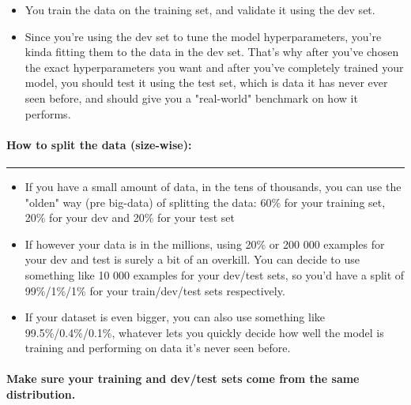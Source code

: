 \documentclass[
]{article}
\begin{document}
\begin{itemize}
\item
  You train the data on the training set, and validate it using the dev
  set.
\item
  Since you're using the dev set to tune the model hyperparameters,
  you're kinda fitting them to the data in the dev set. That's why after
  you've chosen the exact hyperparameters you want and after you've
  completely trained your model, you should test it using the test set,
  which is data it has never ever seen before, and should give you a
  "real-world" benchmark on how it performs.
\end{itemize}

\hypertarget{header-n18}{%
\paragraph{\texorpdfstring{\textbf{How to split the data
(size-wise):}}{How to split the data (size-wise):}}\label{header-n18}}

\begin{center}\rule{0.5\linewidth}{0.5pt}\end{center}

\begin{itemize}
\item
  If you have a small amount of data, in the tens of thousands, you can
  use the "olden" way (pre big-data) of splitting the data: 60\% for
  your training set, 20\% for your dev and 20\% for your test set
\item
  If however your data is in the millions, using 20\% or 200 000
  examples for your dev and test is surely a bit of an overkill. You can
  decide to use something like 10 000 examples for your dev/test sets,
  so you'd have a split of 99\%/1\%/1\% for your train/dev/test sets
  respectively.
\item
  If your dataset is even bigger, you can also use something like
  99.5\%/0.4\%/0.1\%, whatever lets you quickly decide how well the
  model is training and performing on data it's never seen before.
\end{itemize}

\hypertarget{header-n27}{%
\paragraph{\texorpdfstring{\textbf{Make sure your training and dev/test
sets come from the same
distribution.}}{Make sure your training and dev/test sets come from the same distribution.}}\label{header-n27}}
\end{document}
